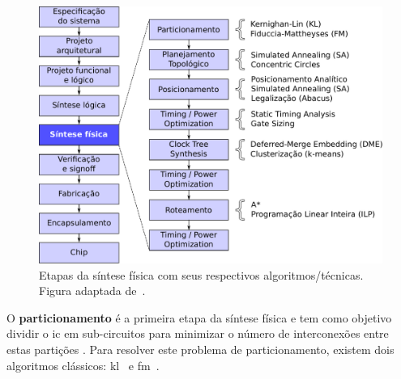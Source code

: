 \begin{figure}[!b]
    \centering
    \includegraphics[width=\textwidth]{img/caracterizacao/exemplo_fluxo_com_algoritmos.pdf}
    \caption[Etapas da síntese física]{Etapas da síntese física com seus respectivos algoritmos/técnicas. Figura adaptada de~.}
    \label{fig:exemplo_fluxo_com_algoritmos}
\end{figure}

O \textbf{particionamento} é a primeira etapa da síntese física e tem como objetivo dividir o \ac{ic} em sub-circuitos para minimizar o número de interconexões entre estas partições \cite{kahng2011vlsi}. Para resolver este problema de particionamento, existem dois algoritmos clássicos: \ac{kl}~\cite{kernighan1970efficient} e \ac{fm}~\cite{fiduccia1988linear}.



